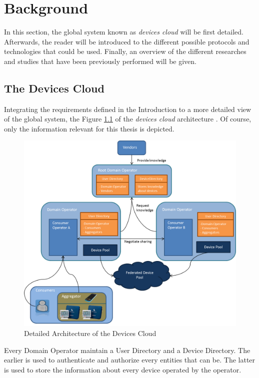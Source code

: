 \chapter{Background}
\label{cha:relatedwork}

In this section, the global system known as \emph{devices cloud} will be first detailed. Afterwards, the reader will be introduced to the different possible protocols and technologies that could be used. Finally, an overview of the different researches and studies that have been previously performed will be given.
 
\section{The Devices Cloud}
Integrating the requirements defined in the Introduction to a more detailed view of the global system, the Figure \ref{fig:design_complete} of the \emph{devices cloud} architecture . Of course, only the information relevant for this thesis is depicted.

\begin{figure}[!ht]
	\centering
	\includegraphics[scale=0.3]{images/design_complete}
	\caption{Detailed Architecture of the Devices Cloud}
	\label{fig:design_complete}
\end{figure}

Every Domain Operator maintain a User Directory and a Device Directory. The earlier is used to authenticate and authorize every entities that can be. The latter is used to store the information about every device operated by the operator.

